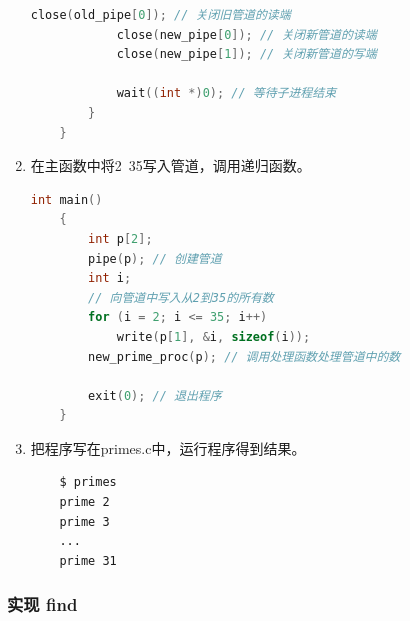\begin{enumerate}
\begin{lstlisting}[language=c, title=new\_prime\_proc函数的实现]
            close(old_pipe[0]); // 关闭旧管道的读端
            close(new_pipe[0]); // 关闭新管道的读端
            close(new_pipe[1]); // 关闭新管道的写端

            wait((int *)0); // 等待子进程结束
        }
    }
    \end{lstlisting}
    \item 在主函数中将2~35写入管道，调用递归函数。
          \begin{lstlisting}[language=c, title=main()函数的实现]
    int main()
    {
        int p[2];
        pipe(p); // 创建管道
        int i;
        // 向管道中写入从2到35的所有数
        for (i = 2; i <= 35; i++)
            write(p[1], &i, sizeof(i));
        new_prime_proc(p); // 调用处理函数处理管道中的数
    
        exit(0); // 退出程序
    }
    \end{lstlisting}
    \item 把程序写在primes.c中，运行程序得到结果。
          \begin{lstlisting}
    $ primes
    prime 2
    prime 3
    ...
    prime 31
    \end{lstlisting}
\end{enumerate}

\subsubsection{实现 find}

